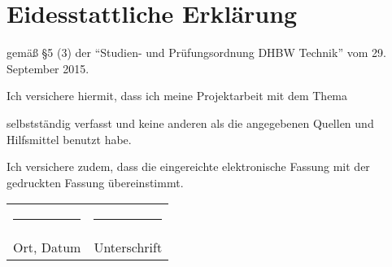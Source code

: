 %
\chapter*{Eidesstattliche Erklärung}
\thispagestyle{empty}
\begin{center}
gemäß \S 5 (3) der "`Studien- und Prüfungsordnung DHBW Technik"' vom 29. September 2015.
\vspace{\baselineskip}

Ich versichere hiermit, dass ich meine Projektarbeit mit dem Thema
\vspace{\baselineskip}

\textbf{\titel}

\vspace{\baselineskip}

selbstständig verfasst und keine anderen als die angegebenen Quellen und Hilfsmittel benutzt habe.
\vspace{\baselineskip}

Ich versichere zudem, dass die eingereichte elektronische Fassung mit der gedruckten Fassung übereinstimmt.

\vspace{3cm}

\begin{tabular}{p{7.5cm}p{7.5cm}}
\rule{6cm}{0.4pt} & \rule{6cm}{0.4pt}\\
Ort, Datum & Unterschrift\\

\end{tabular}
\end{center}
%